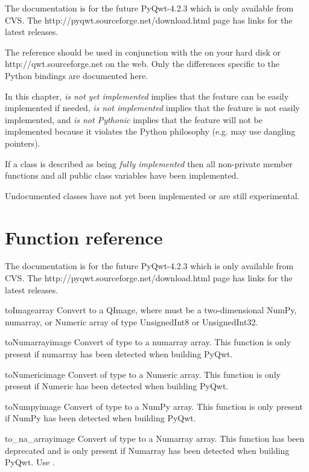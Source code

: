 \documentclass{manual}
\newcommand{\Qwt}{\ulink{Qwt}
  {http://qwt.sourceforge.net}}
\newcommand{\Download}{\ulink{download}
  {http://pyqwt.sourceforge.net/download.html}}
\newcommand{\Future}{
  \begin{notice}[warning]
    The documentation is for the future PyQwt-4.2.3 which is only available
    from CVS. The \Download{} page has links for the latest releases.
  \end{notice}
}
\begin{document}
\Future{}

The reference should be used in conjunction with the
 on your hard disk or \Qwt{} on the web.
Only the differences specific to the Python bindings are documented here.

In this chapter, \emph{is not yet implemented} implies that the feature can
be easily implemented if needed, \emph{is not implemented} implies that the
feature is not easily implemented, and \emph{is not Pythonic} implies that
the feature will not be implemented because it violates the Python philosophy
(e.g. may use dangling pointers).

If a class is described as being \emph{fully implemented} then all non-private
member functions and all public class variables have been implemented.

Undocumented classes have not yet been implemented or are still experimental.


\section{Function reference\label{functions}}

\Future{}

\begin{funcdesc}{toImage}{array}
  Convert  to a QImage, where  must be a two-dimensional
  NumPy, numarray, or Numeric array of type UnsignedInt8 or UnsignedInt32.
\end{funcdesc}

\begin{funcdesc}{toNumarray}{image}
  Convert  of type  to a numarray array. This function
  is only present if numarray has been detected when building PyQwt.
\end{funcdesc}

\begin{funcdesc}{toNumeric}{image}
  Convert  of type  to a Numeric array. This function
  is only present if Numeric has been detected when building PyQwt.
\end{funcdesc}

\begin{funcdesc}{toNumpy}{image}
  Convert  of type  to a NumPy array. This function
  is only present if NumPy has been detected when building PyQwt.
\end{funcdesc}

\begin{funcdesc}{to_na_array}{image}
  Convert  of type  to a Numarray array. This function
  has been deprecated and is only present if Numarray has been detected when
  building PyQwt.  Use .
\end{funcdesc}
\end{document}
